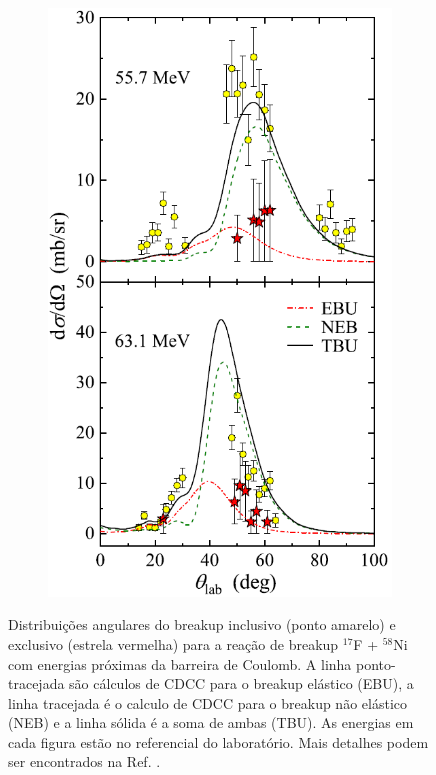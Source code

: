 \documentclass[a4paper,12pt,oneside]{book}
\begin{document}
\begin{figure}[H]
\begin{subfigure}[t]{0.45\textwidth}
        \caption{}
        \label{subfig:dist_ang_3_a}
    \end{subfigure}%
    \hspace{0.5cm}
    \begin{subfigure}[t]{0.45\textwidth}
        \centering
        \includegraphics[scale=0.5, width=.97\columnwidth]{figs/17F_58Ni_near_barrier_b.png}
        \caption{}
        \label{subfig:dist_ang_3_b}
    \end{subfigure}
\caption{Distribuições angulares do breakup inclusivo (ponto amarelo) e exclusivo (estrela vermelha) para a reação de breakup $^{17}$F + $^{58}$Ni com energias próximas da barreira de Coulomb. A linha ponto-tracejada são cálculos de CDCC para o breakup elástico (EBU), a linha tracejada é o calculo de CDCC para o breakup não elástico (NEB) e a linha sólida é a soma de ambas (TBU). As energias em cada figura estão no referencial do laboratório. Mais detalhes podem ser encontrados na Ref. \cite{YANG2021136045}.}
\label{fig:dist_ang_3}
\end{figure}
\end{document}
